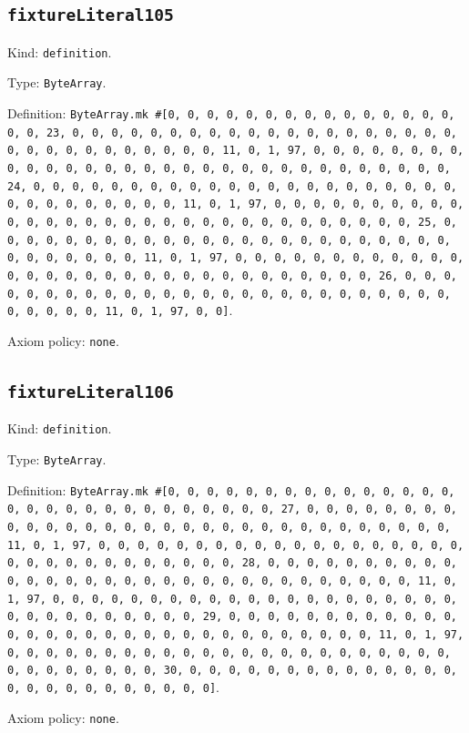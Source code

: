 \documentclass[11pt]{article}
\begin{document}
\subsection*{\texttt{fixtureLiteral105}}
\noindent Kind: \texttt{definition}.\par
\noindent Type: \texttt{ByteArray}.\par
\noindent Definition: \texttt{ByteArray.mk \#[0, 0, 0, 0, 0, 0, 0, 0, 0, 0, 0, 0, 0, 0, 0, 0, 0, 23, 0, 0, 0, 0, 0, 0, 0, 0, 0, 0, 0, 0, 0, 0, 0, 0, 0, 0, 0, 0, 0, 0, 0, 0, 0, 0, 0, 0, 0, 0, 0, 11, 0, 1, 97, 0, 0, 0, 0, 0, 0, 0, 0, 0, 0, 0, 0, 0, 0, 0, 0, 0, 0, 0, 0, 0, 0, 0, 0, 0, 0, 0, 0, 0, 0, 0, 24, 0, 0, 0, 0, 0, 0, 0, 0, 0, 0, 0, 0, 0, 0, 0, 0, 0, 0, 0, 0, 0, 0, 0, 0, 0, 0, 0, 0, 0, 0, 0, 11, 0, 1, 97, 0, 0, 0, 0, 0, 0, 0, 0, 0, 0, 0, 0, 0, 0, 0, 0, 0, 0, 0, 0, 0, 0, 0, 0, 0, 0, 0, 0, 0, 0, 0, 25, 0, 0, 0, 0, 0, 0, 0, 0, 0, 0, 0, 0, 0, 0, 0, 0, 0, 0, 0, 0, 0, 0, 0, 0, 0, 0, 0, 0, 0, 0, 0, 11, 0, 1, 97, 0, 0, 0, 0, 0, 0, 0, 0, 0, 0, 0, 0, 0, 0, 0, 0, 0, 0, 0, 0, 0, 0, 0, 0, 0, 0, 0, 0, 0, 0, 0, 26, 0, 0, 0, 0, 0, 0, 0, 0, 0, 0, 0, 0, 0, 0, 0, 0, 0, 0, 0, 0, 0, 0, 0, 0, 0, 0, 0, 0, 0, 0, 0, 11, 0, 1, 97, 0, 0]}.\par
\noindent Axiom policy: \texttt{none}.\par
\subsection*{\texttt{fixtureLiteral106}}
\noindent Kind: \texttt{definition}.\par
\noindent Type: \texttt{ByteArray}.\par
\noindent Definition: \texttt{ByteArray.mk \#[0, 0, 0, 0, 0, 0, 0, 0, 0, 0, 0, 0, 0, 0, 0, 0, 0, 0, 0, 0, 0, 0, 0, 0, 0, 0, 0, 0, 0, 27, 0, 0, 0, 0, 0, 0, 0, 0, 0, 0, 0, 0, 0, 0, 0, 0, 0, 0, 0, 0, 0, 0, 0, 0, 0, 0, 0, 0, 0, 0, 0, 11, 0, 1, 97, 0, 0, 0, 0, 0, 0, 0, 0, 0, 0, 0, 0, 0, 0, 0, 0, 0, 0, 0, 0, 0, 0, 0, 0, 0, 0, 0, 0, 0, 0, 0, 28, 0, 0, 0, 0, 0, 0, 0, 0, 0, 0, 0, 0, 0, 0, 0, 0, 0, 0, 0, 0, 0, 0, 0, 0, 0, 0, 0, 0, 0, 0, 0, 11, 0, 1, 97, 0, 0, 0, 0, 0, 0, 0, 0, 0, 0, 0, 0, 0, 0, 0, 0, 0, 0, 0, 0, 0, 0, 0, 0, 0, 0, 0, 0, 0, 0, 0, 29, 0, 0, 0, 0, 0, 0, 0, 0, 0, 0, 0, 0, 0, 0, 0, 0, 0, 0, 0, 0, 0, 0, 0, 0, 0, 0, 0, 0, 0, 0, 0, 11, 0, 1, 97, 0, 0, 0, 0, 0, 0, 0, 0, 0, 0, 0, 0, 0, 0, 0, 0, 0, 0, 0, 0, 0, 0, 0, 0, 0, 0, 0, 0, 0, 0, 0, 30, 0, 0, 0, 0, 0, 0, 0, 0, 0, 0, 0, 0, 0, 0, 0, 0, 0, 0, 0, 0, 0, 0, 0, 0, 0]}.\par
\noindent Axiom policy: \texttt{none}.\par
\end{document}
